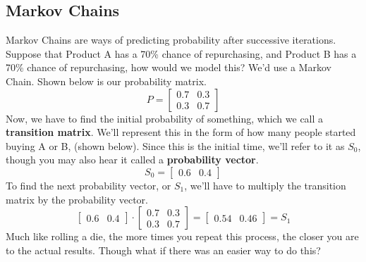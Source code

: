     \subsection{Markov Chains}
    Markov Chains are ways of predicting probability after successive iterations.
    Suppose that Product A has a 70\% chance of repurchasing, and Product B has a 70\% chance of repurchasing, how would we model this? We'd use a Markov Chain. Shown below is our probability matrix.
    \begin{equation*}
        P = 
        \begin{bmatrix}
            0.7 & 0.3\\
            0.3 & 0.7
        \end{bmatrix}
    \end{equation*}
    Now, we have to find the initial probability of something, which we call a \textbf{transition matrix}. We'll represent this in the form of how many people started buying A or B, (shown below). Since this is the initial time, we'll refer to it as $S_{0}$, though you may also hear it called a \textbf{probability vector}.
    \begin{equation*}
    S_{0} = 
        \begin{bmatrix}
            0.6 & 0.4
        \end{bmatrix}
    \end{equation*}
    To find the next probability vector, or $S_{1}$, we'll have to multiply the transition matrix by the probability vector.
    \begin{equation*}
        \begin{bmatrix}
            0.6 & 0.4
        \end{bmatrix}
        \cdot
        \begin{bmatrix}
            0.7 & 0.3\\
            0.3 & 0.7
        \end{bmatrix}
        =
        \begin{bmatrix}
            0.54 & 0.46
        \end{bmatrix}
        = S_{1}
    \end{equation*}
    Much like rolling a die, the more times you repeat this process, the closer you are to the actual results. Though what if there was an easier way to do this?
    
